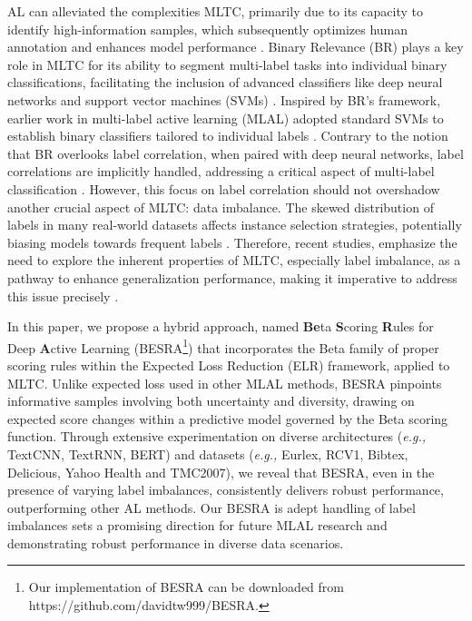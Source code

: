 \documentclass[letterpaper]{article} %
\begin{document}
AL can alleviated the complexities MLTC, primarily due to its capacity to identify high-information samples, which subsequently optimizes human annotation and enhances model performance \citep{REYES2018494, 10.1145/3379504}.
Binary Relevance (BR) plays a key role in MLTC for its ability to segment multi-label tasks into individual binary classifications, facilitating the inclusion of advanced classifiers like deep neural networks and support vector machines (SVMs) \cite{Zhang2018}.
Inspired by BR's framework, earlier work in multi-label active learning (MLAL) adopted standard SVMs to establish binary classifiers tailored to individual labels \cite{mmc2009, adaptive2013, Cherman2019}.
Contrary to the notion that BR overlooks label correlation, when paired with deep neural networks, label correlations are implicitly handled, addressing a critical aspect of multi-label classification \cite{Su2021}.
However, this focus on label correlation should not overshadow another crucial aspect of MLTC: data imbalance. The skewed distribution of labels in many real-world datasets affects instance selection strategies, potentially biasing models towards frequent labels \cite{Wu_Lyu_Ghanem_2016}.
Therefore, recent studies, emphasize the need to explore the inherent properties of MLTC, especially label imbalance, as a pathway to enhance generalization performance, making it imperative to address this issue
 precisely \cite{Zhang2018}.

In this paper, we propose a hybrid approach, named \textbf{Be}ta \textbf{S}coring \textbf{R}ules for Deep \textbf{A}ctive Learning (BESRA\footnote{Our implementation of BESRA can be downloaded from https://github.com/davidtw999/BESRA.}) that incorporates the Beta family of proper scoring rules within the Expected Loss Reduction (ELR) framework, applied to MLTC.
Unlike expected loss used in other MLAL methods, BESRA pinpoints informative samples involving both uncertainty and diversity, drawing on expected score changes within a predictive model governed by the Beta scoring function.
Through extensive experimentation on diverse architectures ({\it e.g.,} TextCNN, TextRNN, BERT) and datasets ({\it e.g.,} Eurlex, RCV1, Bibtex, Delicious, Yahoo Health and TMC2007), we reveal that BESRA, even in the presence of varying label imbalances, consistently delivers robust performance, outperforming other AL methods.
Our BESRA is adept handling of label imbalances sets a promising direction for future MLAL research and demonstrating robust performance in diverse data scenarios.
\end{document}

